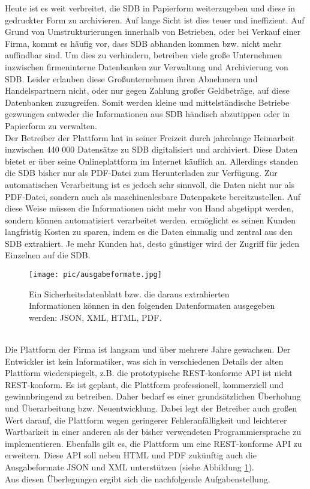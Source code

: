 Heute ist es weit verbreitet, die \ac{SDB} in Papierform
weiterzugeben und diese in gedruckter Form zu archivieren. Auf lange Sicht
ist dies teuer und ineffizient. Auf Grund von Umstrukturierungen innerhalb von
Betrieben, oder bei Verkauf einer Firma, kommt es häufig vor, dass \ac{SDB}
abhanden kommen bzw. nicht mehr auffindbar sind. Um dies zu verhindern,
betreiben viele große Unternehmen inzwischen firmeninterne Datenbanken zur
Verwaltung und Archivierung von \ac{SDB}. Leider erlauben diese Großunternehmen
ihren Abnehmern und Handelspartnern nicht, oder nur gegen Zahlung großer
Geldbeträge, auf diese Datenbanken zuzugreifen. Somit werden kleine und
mittelständische Betriebe gezwungen entweder die Informationen aus \ac{SDB}
händisch abzutippen oder in Papierform zu verwalten.
\\
Der Betreiber der Plattform  hat in seiner Freizeit
durch jahrelange Heimarbeit inzwischen 440 000 Datensätze zu \ac{SDB}
digitalisiert und archiviert. Diese Daten bietet er über seine
Onlineplattform  im Internet käuflich an.
Allerdings standen die \ac{SDB} bisher nur als \ac{PDF}-Datei zum Herunterladen
zur Verfügung. Zur automatischen Verarbeitung ist es jedoch sehr sinnvoll, die
Daten nicht nur als \ac{PDF}-Datei, sondern auch als maschinenlesbare
Datenpakete bereitzustellen. Auf diese Weise müssen die Informationen nicht
mehr von Hand abgetippt werden, sondern können automatisiert verarbeitet werden.
 ermöglicht es seinen Kunden langfristig Kosten zu
sparen, indem es die Daten einmalig und zentral aus den \ac{SDB} extrahiert.
Je mehr Kunden  hat, desto günstiger wird der Zugriff für jeden
Einzelnen auf die \ac{SDB}.
\begin{figure}[ht]
  \centering
    \texttt{[image: pic/ausgabeformate.jpg]}
      \caption[Ausgabeformate eines Sicherheitsdatenblatts]{Ein
      Sicherheitsdatenblatt bzw. die daraus extrahierten Informationen können in den folgenden Datenformaten ausgegeben werden:
      JSON, XML, HTML, PDF.}
      \label{fig:ausgabeformate}
\end{figure}
\\
Die Plattform  der Firma  ist langsam und über
mehrere Jahre gewachsen. Der Entwickler ist kein Informatiker, was sich
in verschiedenen Details der alten Plattform  wiederspiegelt, z.B.
die prototypische \ac{REST}-konforme \ac{API} ist nicht \ac{REST}-konform.
Es ist geplant, die Plattform professionell, kommerziell und gewinnbringend zu
betreiben.
Daher bedarf es einer grundsätzlichen Überholung und Überarbeitung bzw.
Neuentwicklung. Dabei legt der Betreiber auch großen Wert darauf, die Plattform wegen geringerer
Fehleranfälligkeit und leichterer Wartbarkeit in einer anderen als der bisher
verwendeten Programmiersprache zu implementieren. Ebenfalls gilt es, die 
Plattform um eine \ac{REST}-konforme \ac{API} zu erweitern. Diese \ac{API} soll
neben \ac{HTML} und \ac{PDF} zukünftig auch die Ausgabeformate \ac{JSON} und
\ac{XML} unterstützen (siehe Abbildung \ref{fig:ausgabeformate}).
\\
Aus diesen Überlegungen ergibt sich die nachfolgende Aufgabenstellung.


